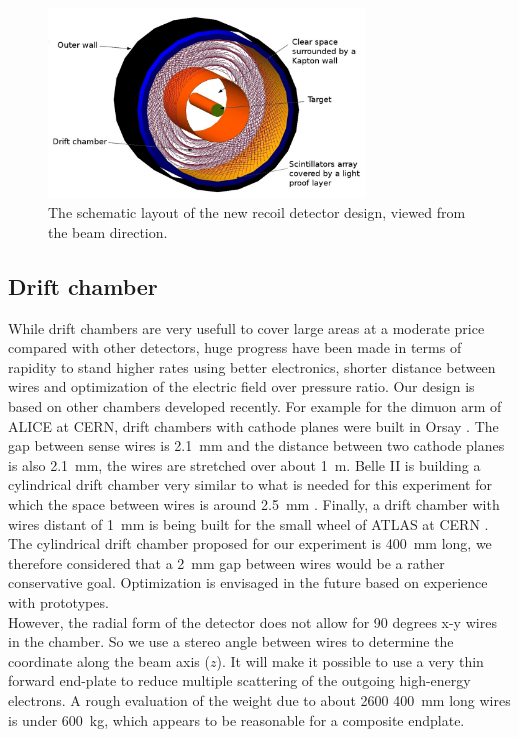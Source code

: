 \begin{figure}[ht!]
  \begin{center}
    \includegraphics[angle=0, width=0.75\textwidth]{./../Detector/fig-chap2/View_det_names.pdf}
    \caption{The schematic layout of the new recoil detector design, viewed from the beam direction.}
    \label{fig:new_lay}
  \end{center}
\end{figure}

\subsection{Drift chamber}

While drift chambers are very usefull to cover large areas at a moderate price 
compared with other detectors, huge progress have been made in terms of 
rapidity to stand higher rates using better electronics, shorter distance 
between wires and optimization of the electric field over pressure ratio. Our 
design is based on other chambers developed recently. For example for the 
dimuon arm of ALICE at CERN, drift chambers with cathode planes were built in 
Orsay \cite{AliceMuonArmChamber}. The gap between sense wires is 2.1~mm and the 
distance between two cathode planes is also 2.1~mm, the wires are stretched 
over about 1~m. Belle II is building a cylindrical drift chamber very similar 
to what is needed for this experiment for which the space between wires is 
around 2.5~mm \cite{BelleIItdr}. Finally, a drift chamber with wires distant of 
1~mm is being built for the small wheel of ATLAS at CERN \cite{ATLASChamber}.  
The cylindrical drift chamber proposed for our experiment is 400~mm long, we 
therefore considered that a 2~mm gap between wires would be a rather 
conservative goal. Optimization is envisaged in the future based on experience 
with prototypes. \\

However, the radial form of the detector does not allow for 90 degrees x-y 
wires in the chamber. So we use a stereo angle between wires to determine the 
coordinate along the beam axis ($z$). It will make it possible to use a very 
thin forward end-plate to reduce multiple scattering of the outgoing 
high-energy electrons. A rough evaluation of the weight due to about 2600 
400~mm long wires is under 600~kg, which appears to be reasonable for a 
composite endplate. \\

